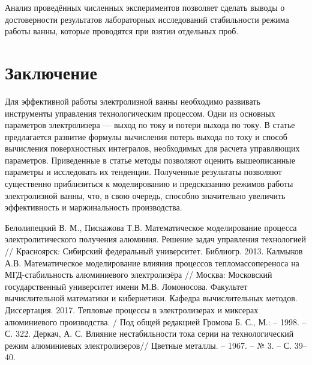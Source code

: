 \documentclass{article}
\begin{document}
Анализ проведённых численных экспериментов позволяет сделать выводы о достоверности результатов лабораторных исследований стабильности режима работы ванны, которые проводятся при взятии отдельных проб.

\section{Заключение}

Для эффективной работы электролизной ванны необходимо развивать инструменты управления технологическим процессом. Одни из основных параметров электролизера — выход по току и потери выхода по току. В статье предлагается развитие формулы вычисления потерь выхода по току и способ вычисления поверхностных интегралов, необходимых для расчета управляющих параметров. Приведенные в статье методы позволяют оценить вышеописанные параметры и исследовать их тенденции. Полученные результаты позволяют существенно приблизиться к моделированию и предсказанию режимов работы электролизной ванны, что, в свою очередь, способно значительно увеличить эффективность и маржинальность производства.

\begin{thebibliography}{}

	  Белолипецкий В. М., Пискажова Т.В. Математическое моделирование процесса электролитического получения алюминия. Решение задач управления технологией // Красноярск: Сибирский федеральный университет. Библиогр. 2013.
	 Калмыков А.В. Математическое моделирование влияния процессов тепломассопереноса на МГД-стабильность алюминиевого электролизёра // Москва: Московский государственный университет имени М.В. Ломоносова. Факультет вычислительной математики и кибернетики. Кафедра вычислительных методов. Диссертация. 2017.
	 Тепловые процессы в электролизерах и миксерах алюминиевого производства. / Под общей редакцией Громова Б. С., М.: – 1998. – С. 322.
	Деркач, А. С. Влияние нестабильности тока серии на технологический режим алюминиевых электролизеров// Цветные металлы. – 1967. – № 3. – С. 39– 40.

\end{thebibliography}
\end{document}
